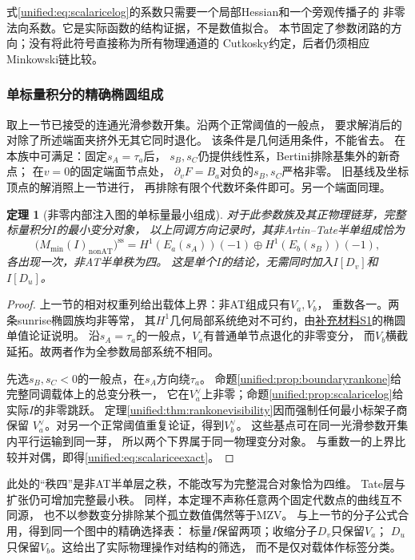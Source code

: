 \documentclass[11pt,a4paper,oneside]{ctexart}
\theoremstyle{cnplain}
\newtheorem{theorem}{定理}[section]
\theoremstyle{definition}
\theoremstyle{remark}
\numberwithin{equation}{section}
\newcommand{\otherref}[2]{\href{#1.pdf}{#2}}
\begin{document}
式\eqref{unified:eq:scalaricelog}的系数只需要一个局部Hessian和一个旁观传播子的
非零法向系数。它是实际函数的结构证据，不是数值拟合。
本节固定了参数闭路的方向；没有将此符号直接称为所有物理通道的
Cutkosky约定，后者仍须相应Minkowski链比较。

\subsubsection{单标量积分的精确椭圆组成}
取上一节已接受的连通光滑参数开集。沿两个正常阈值的一般点，
要求解消后的对除了所述端面夹挤外无其它同时退化。
该条件是几何适用条件，不能省去。
在本族中可满足：固定$s_A=\tau_a$后，
$s_B,s_C$仍提供线性系，Bertini排除基集外的新奇点；
在$v=0$的固定端面节点处，
$\partial_vF=B_a$对负的$s_B,s_C$严格非零。
旧基线及坐标顶点的解消照上一节进行，
再排除有限个代数坏条件即可。另一个端面同理。

\begin{theorem}[非零内部注入图的单标量最小组成]\label{unified:thm:scalaricevisibility}
对于此参数族及其正物理链芽，完整标量积分$I$的最小变分对象，
以上同调方向记录时，其非Artin--Tate半单组成恰为
\begin{equation}\label{unified:eq:scalariceexact}
 \bigl(M_{\min}(I)_{\mathrm{nonAT}}\bigr)^{\mathrm{ss}}
       =H^1(E_a(s_A))(-1)\oplus H^1(E_b(s_B))(-1),
\end{equation}
各出现一次，非AT半单秩为四。
这是单个$I$的结论，无需同时加入$I[D_v]$和$I[D_u]$。
\end{theorem}
\begin{proof}
上一节的相对权重列给出载体上界：非AT组成只有$V_a,V_b$，
重数各一。两条sunrise椭圆族均非等常，
其$H^1$几何局部系统绝对不可约，由\otherref{feynman_periods_supplement}{补充材料S1}的椭圆单值论证说明。
沿$s_A=\tau_a$的一般点，$V_a$有普通单节点退化的非零变分，
而$V_b$横截延拓。故两者作为全参数局部系统不相同。

先选$s_B,s_C<0$的一般点，在$s_A$方向绕$\tau_a$。
命题\ref{unified:prop:boundaryrankone}给完整同调载体上的总变分秩一，
它在$V_a^\vee$上非零；命题\ref{unified:prop:scalaricelog}给实际$I$的非零跳跃。
定理\ref{unified:thm:rankonevisibility}因而强制任何最小标架子商保留
$V_a^\vee$。对另一个正常阈值重复论证，得到$V_b^\vee$。
这些基点可在同一光滑参数开集内平行运输到同一芽，
所以两个下界属于同一物理变分对象。
与重数一的上界比较并对偶，即得\eqref{unified:eq:scalariceexact}。
\end{proof}

此处的“秩四”是非AT半单层之秩，不能改写为完整混合对象恰为四维。
Tate层与扩张仍可增加完整最小秩。
同样，本定理不声称任意两个固定代数点的曲线互不同源，
也不以参数变分排除某个孤立数值偶然等于MZV。
与上一节的分子公式合用，得到同一个图中的精确选择表：
标量$I$保留两项；收缩分子$D_v$只保留$V_a$；
$D_u$只保留$V_b$。这给出了实际物理操作对结构的筛选，
而不是仅对载体作标签分类。
\end{document}
